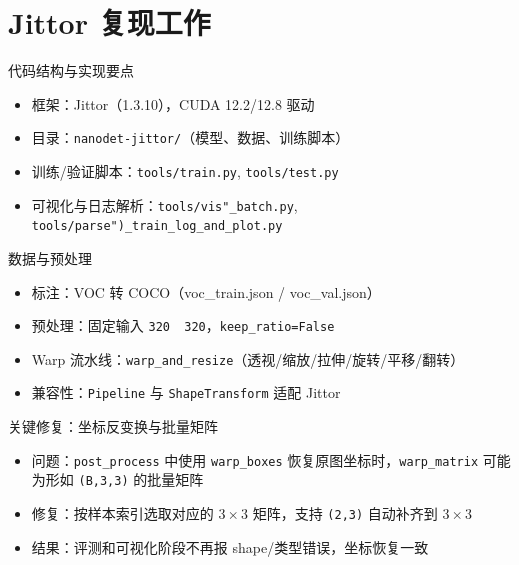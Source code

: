 \documentclass{beamer}
\begin{document}
\section{Jittor 复现工作}

\begin{frame}{代码结构与实现要点}
  \begin{itemize}
    \item 框架：Jittor（1.3.10），CUDA 12.2/12.8 驱动
    \item 目录：\texttt{nanodet-jittor/}（模型、数据、训练脚本）
    \item 训练/验证脚本：\texttt{tools/train.py}, \texttt{tools/test.py}
    \item 可视化与日志解析：\texttt{tools/vis"}\texttt{_batch.py}, \texttt{tools/parse")}\texttt{\_train\_log\_and\_plot.py}
  \end{itemize}
\end{frame}

\begin{frame}{数据与预处理}
  \begin{itemize}
    \item 标注：VOC 转 COCO（voc\_train.json / voc\_val.json）
    \item 预处理：固定输入 \texttt{320\,\times\,320}，\texttt{keep\_ratio=False}
    \item Warp 流水线：\texttt{warp\_and\_resize}（透视/缩放/拉伸/旋转/平移/翻转）
    \item 兼容性：\texttt{Pipeline} 与 \texttt{ShapeTransform} 适配 Jittor
  \end{itemize}
\end{frame}

\begin{frame}{关键修复：坐标反变换与批量矩阵}
  \begin{itemize}
    \item 问题：\texttt{post\_process} 中使用 \texttt{warp\_boxes} 恢复原图坐标时，\texttt{warp\_matrix} 可能为形如 \texttt{(B,3,3)} 的批量矩阵
    \item 修复：按样本索引选取对应的 $3\times3$ 矩阵，支持 \texttt{(2,3)} 自动补齐到 $3\times3$
    \item 结果：评测和可视化阶段不再报 shape/类型错误，坐标恢复一致
  \end{itemize}
\end{frame}
\end{document}
